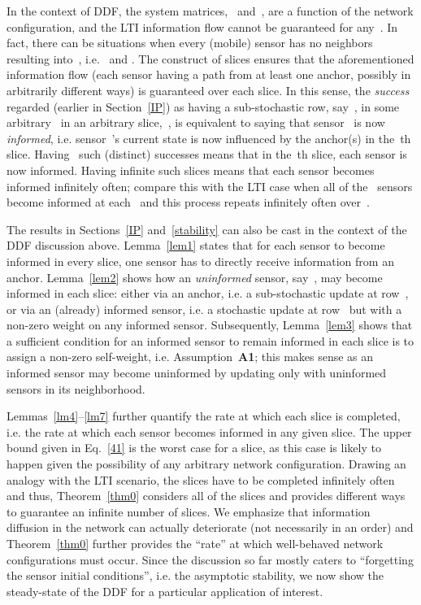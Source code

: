 \documentclass[draftclsnofoot, onecolumn, 12pt]{IEEEtran}
\begin{document}
In the context of DDF, the system matrices,~ and~, are a function of the network configuration, and the LTI information flow cannot be guaranteed for any~. In fact, there can be situations when every (mobile) sensor has no neighbors resulting into~, i.e.~ and . The construct of slices ensures that the aforementioned information flow (each sensor having a path from at least one anchor, possibly in arbitrarily different ways) is guaranteed over each slice. In this sense, the \emph{success} regarded (earlier in Section~\ref{IP}) as having a sub-stochastic row, say~, in some arbitrary~ in an arbitrary slice,~, is equivalent to saying that sensor~ is now \emph{informed}, i.e. sensor~'s current state is now influenced by the anchor(s) in the~th slice. Having~ such (distinct) successes means that in the~th slice, each sensor is now informed. Having infinite such slices means that each sensor becomes informed infinitely often; compare this with the LTI case when all of the~ sensors become informed at each~ and this process repeats infinitely often over~.

The results in Sections~\ref{IP} and~\ref{stability} can also be cast in the context of the DDF discussion above. Lemma~\ref{lem1} states that for each sensor to become informed in every slice, one sensor has to directly receive information from an anchor. Lemma~\ref{lem2} shows how an \emph{uninformed} sensor, say~, may become informed in each slice: either via an anchor, i.e. a sub-stochastic update at row~, or via an (already) informed sensor, i.e. a stochastic update at row~ but with a non-zero weight on any informed sensor. Subsequently, Lemma~\ref{lem3} shows that a sufficient condition for an informed sensor to remain informed in each slice is to assign a non-zero self-weight, i.e. Assumption~{\bf A1}; this makes sense as an informed sensor may become uninformed by updating only with uninformed sensors in its neighborhood.

Lemmas~\ref{lm4}--\ref{lm7} further quantify the rate at which each slice is completed, i.e. the rate at which each sensor becomes informed in any given slice. The upper bound given in Eq.~\eqref{41} is the worst case for a slice, as this case is likely to happen given the possibility of any arbitrary network configuration. Drawing an analogy with the LTI scenario, the slices have to be completed infinitely often and thus, Theorem~\ref{thm0} considers all of the slices and provides different ways to guarantee an infinite number of slices. We emphasize that information diffusion in the network can actually deteriorate (not necessarily in an order) and Theorem~\ref{thm0} further provides the ``rate'' at which well-behaved network configurations must occur. Since the discussion so far mostly caters to ``forgetting the sensor initial conditions'', i.e. the asymptotic stability, we now show the steady-state of the DDF for a particular application of interest. 
\end{document}

